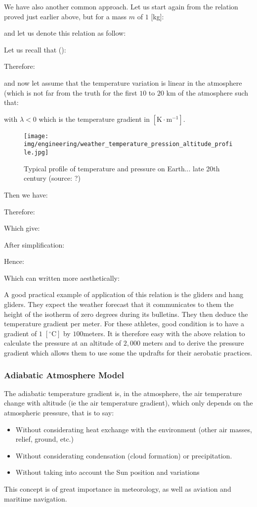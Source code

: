 	We have also another common approach. Let us start again from the relation proved just earlier above, but for a mass $m$ of $1$ [kg]:
	
	and let us denote this relation as follow:
	
	Let us recall that ():
	
	Therefore:	
	
	and now let assume that the temperature variation is linear in the atmosphere (which is not far from the truth for the first $10$ to $20$ km of the atmosphere such that:
	
	with $\lambda<0$ which is the temperature gradient in $[\text{K}\cdot\text{m}^{-1}]$.
	\begin{figure}[H]
		\begin{center}
			\texttt{[image: img/engineering/weather\_temperature\_pression\_altitude\_profile.jpg]}
		\end{center}	
		\caption[Typical profile of temperature and pressure on Earth]{Typical profile of temperature and pressure on Earth... late 20th century (source: ?)}
	\end{figure}
	Then we have:
	
	Therefore:
	
	Which give:
	
	After simplification:
	
	Hence:
	
	Which can written more aesthetically:
	
	A good practical example of application of this relation is the gliders and hang gliders. They expect the weather forecast that it communicates to them the height of the isotherm of zero degrees during its bulletins. They then deduce the temperature gradient per meter. For these athletes, good condition is to have a gradient of $1\;[^\circ \text{C}]$ by $100 $meters. It is therefore easy with the above relation to calculate the pressure at an altitude of $2,000$ meters and to derive the pressure gradient which allows them to use some the updrafts for their aerobatic practices.
	
	\subsubsection{Adiabatic Atmosphere Model}
	The adiabatic temperature gradient is, in the atmosphere, the air temperature change with altitude (ie the air temperature gradient), which only depends on the atmospheric pressure, that is to say:
	\begin{itemize}
		\item Without considerating heat exchange with the environment (other air masses, relief, ground, etc.)

		\item  Without considerating condensation (cloud formation) or precipitation.
	
		\item Without taking into account the Sun position and variations
	\end{itemize}
	This concept is of great importance in meteorology, as well as aviation and maritime navigation.

